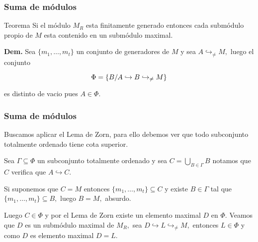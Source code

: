 \documentclass[notes=show]{beamer}%
\newenvironment{Teo}{\begin{block}{Teorema}}{\end{block}}
\begin{document}
\begin{frame}%


\bigskip%
\frametitle{Suma de módulos}%


\begin{Teo}
Si el módulo $M_{R}$ esta finitamente generado entonces cada submódulo
propio de $M$ esta contenido en un submódulo maximal.
\end{Teo}

\qquad

\textbf{Dem. }Sea $\{m_{1},\ldots,m_{t}\}$ un conjunto de generadores de $M$ y
sea $A\hookrightarrow_{\neq}M,$ luego el conjunto%

\[
\Phi=\{B/A\hookrightarrow B\bigskip\hookrightarrow_{\neq}M\}
\]


es distinto de vacio pues $A\in\Phi.$

\bigskip%

\transboxout
\end{frame}%


\bigskip%

\begin{frame}%


\bigskip%
\frametitle{Suma de módulos}%


\bigskip Buscamos aplicar el Lema de Zorn, para ello debemos ver que todo
subconjunto totalmente ordenado tiene cota superior.

Sea $\Gamma\subseteq\Phi$ un subconjunto totalmente ordenado y sea $C=%
{\displaystyle\bigcup\limits_{B\in\Gamma}}
B$ notamos que $C$ verifica que $A\hookrightarrow C.$

Si suponemos que $C=M$ entonces $\{m_{1},\ldots,m_{t}\}\subseteq C$ y existe
$B\in\Gamma$ tal que $\{m_{1},\ldots,m_{t}\}\subseteq B,$ luego $B=M,$ absurdo.

Luego $C\in\Phi$ y por el Lema de Zorn existe un elemento maximal $D$ en
$\Phi.$ Veamos que $D$ es un submódulo maximal de $M_{R},$ sea
$D\hookrightarrow L\hookrightarrow_{\neq}M,$ entonces $L\in\Phi$ y como $D$ es
elemento maximal $D=L$.%

\transboxout
\end{frame}%
\end{document}
